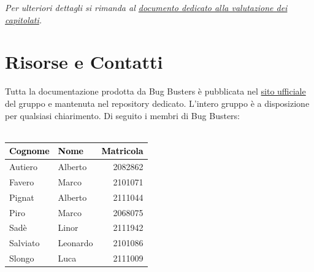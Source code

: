 \documentclass[a4paper,11pt]{article}
\begin{document}
\vspace{1em}

\begin{tcolorbox}[
    colback=lightgray,
    colframe=secondarycolor,
    arc=2mm,
    boxrule=0pt,
    left=10pt,
    right=10pt,
    top=8pt,
    bottom=8pt
]
    \small\textit{Per ulteriori dettagli si rimanda al \href{../SCELTA CAPITOLATO/Resoconto_capitolati.pdf}{documento dedicato alla valutazione dei capitolati}.}
\end{tcolorbox}


\section*{Risorse e Contatti}

Tutta la documentazione prodotta da Bug Busters è pubblicata nel \href{https://bugbustersunipd.github.io/BugBusterSite/}{sito ufficiale} del gruppo e mantenuta nel repository dedicato.
L'intero gruppo è a disposizione per qualsiasi chiarimento. Di seguito i membri di Bug Busters: \\ \\ 
\begin{center}
\setlength{\arrayrulewidth}{0.8pt}
\begin{tabular}{|l|l|r|}
\hline
\rowcolor{primarycolor!20}
\textcolor{black}{\textbf{Cognome}} & \textcolor{black}{\textbf{Nome}} & \textcolor{black}{\textbf{Matricola}} \\
\hline
Autiero & Alberto & 2082862 \\
\hline
Favero & Marco & 2101071 \\
\hline
Pignat & Alberto & 2111044 \\
\hline
Piro & Marco & 2068075 \\
\hline
Sadè & Linor & 2111942 \\
\hline
Salviato & Leonardo & 2101086 \\
\hline
Slongo & Luca & 2111009 \\
\hline
\end{tabular}
\end{center}
\end{document}
